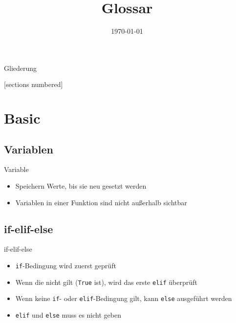 



\title{Glossar}
\date{\today}
\setlength{\columnsep}{.4cm}



\maketitle

\begin{frame}{Gliederung}
	\begin{multicols}{2}
		[sections numbered]
		\tableofcontents
	\end{multicols}
\end{frame}


\section{Basic}

\subsection{Variablen}
\begin{frame}{Variable}
	\begin{itemize}
		\item Speichern Werte, bis sie neu gesetzt werden
		\item Variablen in einer Funktion sind nicht außerhalb sichtbar
	\end{itemize}
\end{frame}

\subsection{if-elif-else}
\begin{frame}{if-elif-else}
	\begin{itemize}
		\item \texttt{if}-Bedingung wird zuerst geprüft
		\item Wenn die nicht gilt (\texttt{True} ist), wird das erste \texttt{elif} überprüft
		\item Wenn keine \texttt{if}- oder \texttt{elif}-Bedingung gilt, kann \texttt{else} ausgeführt werden
		\item \texttt{elif} und \texttt{else} muss es nicht geben
	\end{itemize}
\end{frame}

